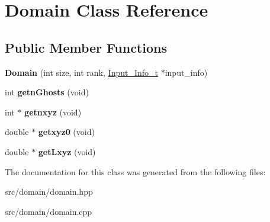 \hypertarget{class_domain}{}\section{Domain Class Reference}
\label{class_domain}
\subsection*{Public Member Functions}
\begin{DoxyCompactItemize}
\item 
\hypertarget{class_domain_a27d315196d4c79b6e80c2123bc06c975}{}\label{class_domain_a27d315196d4c79b6e80c2123bc06c975} 
{\bfseries Domain} (int size, int rank, \hyperlink{struct_input___info__t}{Input\+\_\+\+Info\+\_\+t} $\ast$input\+\_\+info)
\item 
\hypertarget{class_domain_ac1b8746a797f7ab2123999f8ea06a9dc}{}\label{class_domain_ac1b8746a797f7ab2123999f8ea06a9dc} 
int {\bfseries getn\+Ghosts} (void)
\item 
\hypertarget{class_domain_a618e79f2f494218923d40cf014997b69}{}\label{class_domain_a618e79f2f494218923d40cf014997b69} 
int $\ast$ {\bfseries getnxyz} (void)
\item 
\hypertarget{class_domain_a603724205a08d6f17755d4d2152209f0}{}\label{class_domain_a603724205a08d6f17755d4d2152209f0} 
double $\ast$ {\bfseries getxyz0} (void)
\item 
\hypertarget{class_domain_a85f15ae00a318da34e8dfde4e0f1fdab}{}\label{class_domain_a85f15ae00a318da34e8dfde4e0f1fdab} 
double $\ast$ {\bfseries get\+Lxyz} (void)
\end{DoxyCompactItemize}


The documentation for this class was generated from the following files\+:\begin{DoxyCompactItemize}
\item 
src/domain/domain.\+hpp\item 
src/domain/domain.\+cpp\end{DoxyCompactItemize}

